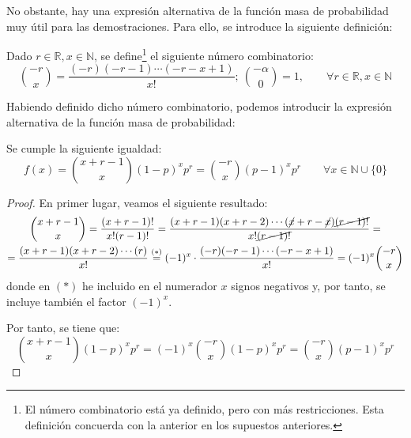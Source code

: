 No obstante, hay una expresión alternativa de la función masa de probabilidad muy útil para las demostraciones. Para ello, se introduce la siguiente definición:
\begin{definicion}
    Dado $r\in \mathbb{R}, x\in \mathbb{N}$, se define\footnote{El número combinatorio está ya definido, pero con más restricciones. Esta definición concuerda con la anterior en los supuestos anteriores.} el siguiente número combinatorio:
    \begin{equation*}
        \binom{-r}{x} = \frac{(-r)(-r-1)\cdots (-r-x+1)}{x!};~\binom{-\alpha}{0}=1, \qquad \forall r\in \mathbb{R}, x\in \mathbb{N}
    \end{equation*}
\end{definicion}

Habiendo definido dicho número combinatorio, podemos introducir la expresión alternativa de la función masa de probabilidad:
\begin{prop} Se cumple la siguiente igualdad:
    \begin{equation*}
        f(x)=\binom{x+r-1}{x}(1-p)^{x}p^r=\binom{-r}{x}(p-1)^xp^r \qquad \forall x\in \mathbb{N}\cup \{0\}
    \end{equation*}
\end{prop}
\begin{proof}
    En primer lugar, veamos el siguiente resultado:
    \begin{multline*}
        \binom{x+r-1}{x}
        = \frac{(x+r-1)!}{x!(r-1)!}
        = \frac{(x+r-1)(x+r-2)\cdots(\cancel{x}+r-\cancel{x})\cancel{(r-1)!}}{x!\cancel{(r-1)!}}
        =\\= \frac{(x+r-1)(x+r-2)\cdots(r)}{x!}
        \stackrel{(\ast)}{=} (-1)^x\cdot \frac{(-r)(-r-1)\cdots (-r-x+1)}{x!}
        = (-1)^x\binom{-r}{x}
    \end{multline*}
    donde en $(\ast)$ he incluido en el numerador $x$ signos negativos y, por tanto, se incluye también el factor $(-1)^x$.
    
    Por tanto, se tiene que:
    \begin{equation*}
        \binom{x+r-1}{x}(1-p)^{x}p^r
        = (-1)^x\binom{-r}{x}(1-p)^xp^r
        = \binom{-r}{x}(p-1)^xp^r
    \end{equation*}
\end{proof}


